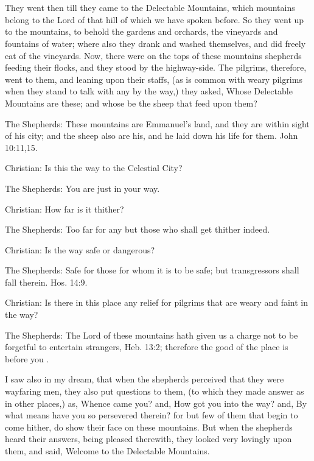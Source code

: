 \chapter[THE EIGHTH STAGE]{}

They went then till they came to the Delectable Mountains, which mountains belong to the Lord of that hill of which we have spoken before. So they went up to the mountains, to behold the gardens and orchards, the vineyards and fountains of water; where also they drank and washed themselves, and did freely eat of the vineyards. Now, there were on the tops of these mountains shepherds feeding their flocks, and they stood by the highway-side. The pilgrims, therefore, went to them, and leaning upon their staffs, (as is common with weary pilgrims when they stand to talk with any by the way,) they asked, Whose Delectable Mountains are these; and whose be the sheep that feed upon them?

The Shepherds: These mountains are Emmanuel's land, and they are within sight of his city; and the sheep also are his, and he laid down his life for them. John 10:11,15.

Christian: Is this the way to the Celestial City?

The Shepherds: You are just in your way.

Christian: How far is it thither?

The Shepherds: Too far for any but those who shall get thither indeed.

Christian: Is the way safe or dangerous?

The Shepherds: Safe for those for whom it is to be safe; but transgressors shall fall therein. Hos. 14:9.

Christian: Is there in this place any relief for pilgrims that are weary and faint in the way?

The Shepherds: The Lord of these mountains hath given us a charge not to be forgetful to entertain strangers, Heb. 13:2; therefore the good of the place is before you .

I saw also in my dream, that when the shepherds perceived that they were wayfaring men, they also put questions to them, (to which they made answer as in other places,) as, Whence came you? and, How got you into the way? and, By what means have you so persevered therein? for but few of them that begin to come hither, do show their face on these mountains. But when the shepherds heard their answers, being pleased therewith, they looked very lovingly upon them, and said, Welcome to the Delectable Mountains.

